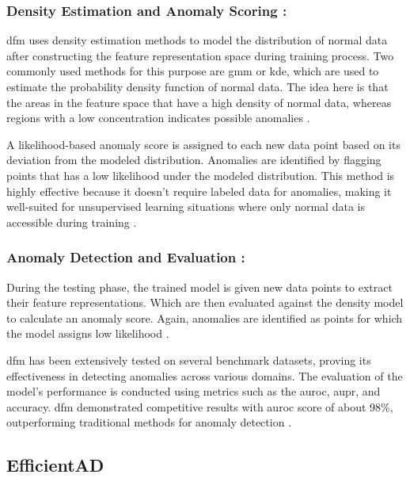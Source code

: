 \subsubsection*{Density Estimation and Anomaly Scoring :}

\gls{dfm} uses density estimation methods to model the distribution of normal data after constructing the feature representation space during training process. Two commonly used methods for this purpose are \gls{gmm} or \gls{kde}, which are used to estimate the probability density function of normal data. The idea here is that the areas in the feature space that have a high density of normal data, whereas regions with a low concentration indicates possible anomalies \cite{ahuja2019probabilisticmodelingdeepfeatures}.

A likelihood-based anomaly score is assigned to each new data point based on its deviation from the modeled distribution. Anomalies are identified by flagging points that has a low likelihood under the modeled distribution. This method is highly effective because it doesn't require labeled data for anomalies, making it well-suited for unsupervised learning situations where only normal data is accessible during training \cite{ahuja2019probabilisticmodelingdeepfeatures}.

\subsubsection*{Anomaly Detection and Evaluation :}

During the testing phase, the trained model is given new data points to extract their feature representations. Which are then evaluated against the density model to calculate an anomaly score. Again, anomalies are identified as points for which the model assigns low likelihood \cite{ahuja2019probabilisticmodelingdeepfeatures}.

\gls{dfm} has been extensively tested on several benchmark datasets, proving its effectiveness in detecting anomalies across various domains. The evaluation of the model's performance is conducted using metrics such as the \gls{auroc}, \gls{aupr}, and accuracy. \gls{dfm} demonstrated competitive results with \gls{auroc} score of about 98\%, outperforming traditional methods for anomaly detection \cite{ahuja2019probabilisticmodelingdeepfeatures}. 

\subsection{EfficientAD}
\label{subsec:efficientad}

